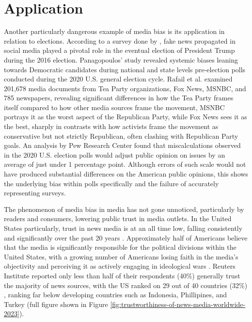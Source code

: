 \section{Application}

Another particularly dangerous example of media bias is its application in relation to elections. According to a survey done by \cite{allcott-2017-socialmedia-2016election}, fake news propagated in social media played a pivotal role in the eventual election of President Trump during the 2016 election. Panagopoulos' study \cite{panagopoulos-2020} revealed systemic biases leaning towards Democratic candidates during national and state levels pre-election polls conducted during the 2020 U.S. general election cycle. Rafail et al. \cite{rafail-2018-tea-party} examined 201,678 media documents from Tea Party organizations, Fox News, MSNBC, and 785 newspapers, revealing significant differences in how the Tea Party frames itself compared to how other media sources frame the movement, MSNBC portrays it as the worst aspect of the Republican Party, while Fox News sees it as the best, sharply in contrasts with how activists frame the movement as conservative but not strictly Republican, often clashing with Republican Party goals. An analysis by Pew Research Center \cite{pew-2021-election2020} found that miscalculations observed in the 2020 U.S. election polls would adjust public opinion on issues by an average of just under 1 percentage point. Although errors of such scale would not have produced substantial differences on the American public opinions, this shows the underlying bias within polls specifically and the failure of accurately representing surveys.

The phenomenon of media bias in media has not gone unnoticed, particularly by readers and consumers, lowering public trust in media outlets. In the United States particularly, trust in news media is at an all time low, falling consistently and significantly over the past 20 years \cite{pew-2021-partisan-divides, gallup-knight-2020-american-views, reuters-2023-digital-news-report}. Approximately half of Americans believe that the media is significantly responsible for the political divisions within the United States, with a growing number of Americans losing faith in the media's objectivity and perceiving it as actively engaging in ideological wars \cite{gallup-knight-2020-american-views}. Reuters Institute reported only less than half of their respondents (40\%) generally trust the majority of news sources, with the US ranked on 29 out of 40 countries (32\%) \cite{reuters-2023-digital-news-report,reuters-2023-trust}, ranking far below developing countries such as Indonesia, Phillipines, and Turkey (full figure shown in Figure \ref{fig:trustworthiness-of-news-media-worldwide-2023}).

